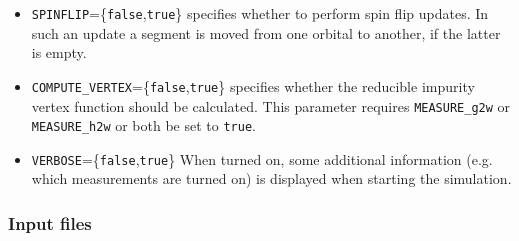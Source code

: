 \documentclass[aps,prb,floatfix,superscriptaddress,twocolumn,notitlepage]{revtex4-1}
\begin{document}
\begin{itemize}
\subsubsection{Optional control parameters}

\item \verb#SPINFLIP#=\{\verb#false#,\verb#true#\} specifies whether to perform spin flip updates. In such an update a segment is moved from one orbital to another, if the latter is empty.

\item \verb#COMPUTE_VERTEX#=\{\verb#false#,\verb#true#\} specifies whether the reducible impurity vertex function should be calculated. This parameter requires \verb#MEASURE_g2w# or \verb#MEASURE_h2w# or both be set to \verb#true#.

\item \verb#VERBOSE#=\{\verb#false#,\verb#true#\} When turned on, some additional information (e.g. which measurements are turned on) is displayed when starting the simulation.

\end{itemize}

\subsubsection{Input files}
\end{document}
